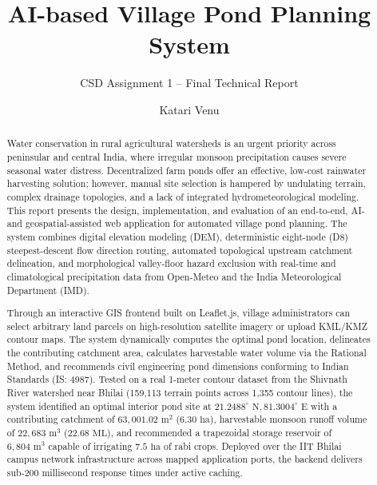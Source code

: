 \documentclass[manuscript,screen,nonacm]{acmart}
\begin{document}
\title{AI-based Village Pond Planning System}
\subtitle{CSD Assignment 1 -- Final Technical Report}

\author{Katari Venu}

\renewcommand{\shortauthors}{Katari Venu}

\begin{abstract}
Water conservation in rural agricultural watersheds is an urgent priority across peninsular and central India, where irregular monsoon precipitation causes severe seasonal water distress. Decentralized farm ponds offer an effective, low-cost rainwater harvesting solution; however, manual site selection is hampered by undulating terrain, complex drainage topologies, and a lack of integrated hydrometeorological modeling. This report presents the design, implementation, and evaluation of an end-to-end, AI- and geospatial-assisted web application for automated village pond planning. The system combines digital elevation modeling (DEM), deterministic eight-node (D8) steepest-descent flow direction routing, automated topological upstream catchment delineation, and morphological valley-floor hazard exclusion with real-time and climatological precipitation data from Open-Meteo and the India Meteorological Department (IMD). 

Through an interactive GIS frontend built on Leaflet.js, village administrators can select arbitrary land parcels on high-resolution satellite imagery or upload KML/KMZ contour maps. The system dynamically computes the optimal pond location, delineates the contributing catchment area, calculates harvestable water volume via the Rational Method, and recommends civil engineering pond dimensions conforming to Indian Standards (IS: 4987). Tested on a real 1-meter contour dataset from the Shivnath River watershed near Bhilai (159,113 terrain points across 1,355 contour lines), the system identified an optimal interior pond site at $21.2488^\circ\text{ N}, 81.3004^\circ\text{ E}$ with a contributing catchment of $63,001.02\text{ m}^2$ ($6.30\text{ ha}$), harvestable monsoon runoff volume of $22,683\text{ m}^3$ ($22.68\text{ ML}$), and recommended a trapezoidal storage reservoir of $6,804\text{ m}^3$ capable of irrigating $7.5\text{ ha}$ of rabi crops. Deployed over the IIT Bhilai campus network infrastructure across mapped application ports, the backend delivers sub-200 millisecond response times under active caching.
\end{abstract}
\end{document}
